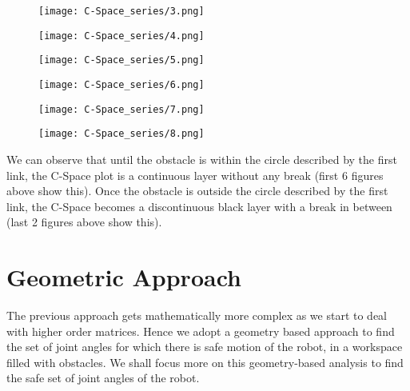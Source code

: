 \documentclass[12pt]{article}
\begin{document}
\begin{figure}[h]
    \centering

    \begin{minipage}{0.48\textwidth}
        \centering
        \texttt{[image: C-Space\_series/3.png]}
    \end{minipage}
    \hfill
    \begin{minipage}{0.48\textwidth}
        \centering
        \texttt{[image: C-Space\_series/4.png]}
    \end{minipage}

    \vspace{0.5cm}

    \begin{minipage}{0.48\textwidth}
        \centering
        \texttt{[image: C-Space\_series/5.png]}
    \end{minipage}
    \hfill
    \begin{minipage}{0.48\textwidth}
        \centering
        \texttt{[image: C-Space\_series/6.png]}
    \end{minipage}

    \vspace{0.5cm}

    \begin{minipage}{0.48\textwidth}
        \centering
        \texttt{[image: C-Space\_series/7.png]}
    \end{minipage}
    \hfill
    \begin{minipage}{0.48\textwidth}
        \centering
        \texttt{[image: C-Space\_series/8.png]}
    \end{minipage}

\end{figure}
\clearpage
We can observe that until the obstacle is within the circle described by the first link, the C-Space plot is a continuous layer without any break (first 6 figures above show this). Once the obstacle is outside the circle described by the first link, the C-Space becomes a discontinuous black layer with a break in between (last 2 figures above show this).
\section{Geometric Approach}
The previous approach gets mathematically more complex as we start to deal with higher order matrices. Hence we adopt a geometry based approach to find the set of joint angles for which there is safe motion of the robot, in a workspace filled with obstacles. We shall focus more on this geometry-based analysis to find the safe set of joint angles of the robot.
\end{document}
